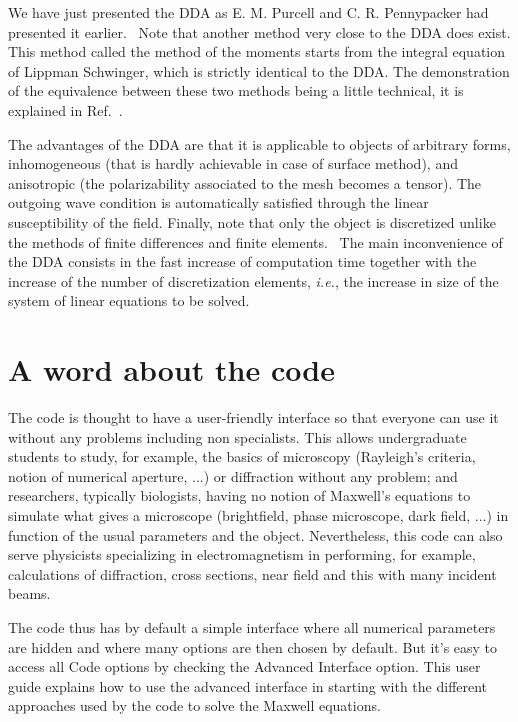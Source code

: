 We have just presented the DDA as E. M. Purcell and C. R. Pennypacker
had presented it earlier.~\cite{Purcell_AJ_73} Note that another
method very close to the DDA does exist. This method called the method
of the moments starts from the integral equation of Lippman Schwinger,
which is strictly identical to the DDA. The demonstration of the
equivalence between these two methods being a little technical, it is
explained in Ref.~\cite{Chaumet_PRE_04}.

The advantages of the DDA are that it is applicable to objects of
arbitrary forms, inhomogeneous (that is hardly achievable in case of
surface method), and anisotropic (the polarizability associated to the
mesh becomes a tensor). The outgoing wave condition is automatically
satisfied through the linear susceptibility of the field. Finally,
note that only the object is discretized unlike the methods of finite
differences and finite elements.~\cite{Kahnert_JQSRT_03} The main
inconvenience of the DDA consists in the fast increase of computation
time together with the increase of the number of discretization
elements, {\it i.e.}, the increase in size of the system of linear
equations to be solved.  

\section{A word about the code}

The code is thought to have a user-friendly interface so that everyone
can use it without any problems including non specialists. This allows
undergraduate students to study, for example, the basics of microscopy
(Rayleigh's criteria, notion of numerical aperture, ...)  or
diffraction without any problem; and researchers, typically
biologists, having no notion of Maxwell's equations to simulate what
gives a microscope (brightfield, phase microscope, dark field, ...) in
function of the usual parameters and the object. Nevertheless, this
code can also serve physicists specializing in electromagnetism in
performing, for example, calculations of diffraction, cross sections,
near field and this with many incident beams.

The code thus has by default a simple interface where all numerical
parameters are hidden and where many options are then chosen by
default. But it's easy to access all Code options by checking the
Advanced Interface option. This user guide explains how to use the
advanced interface in starting with the different approaches used by
the code to solve the Maxwell equations.

